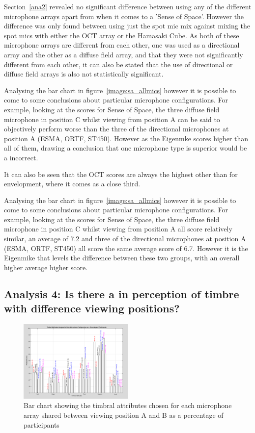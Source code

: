 		Section~\ref{ana2} revealed no significant difference between using any of the different microphone arrays apart from when it comes to a 'Sense of Space'. However the difference was only found between using just the spot mic mix against mixing the spot mics with either the OCT array or the Hamasaki Cube. As both of these microphone arrays are different from each other, one was used as a directional array and the other as a diffuse field array, and that they were not significantly different from each other, it can also be stated that the use of directional or diffuse field arrays is also not statistically significant.


		Analysing the bar chart in figure~\ref{image:sa_allmics} however it is possible to come to some conclusions about particular microphone configurations. For example, looking at the scores for Sense of Space, the three diffuse field microphone in position C whilst viewing from position A can be said to objectively perform worse than the three of the directional microphones at position A (ESMA, ORTF, ST450). However as the Eigenmke scores higher than all of them, drawing a conclusion that one microphone type is superior would be a incorrect.

		It can also be seen that the OCT scores are always the highest other than for envelopment, where it comes as a close third.

		Analysing the bar chart in figure~\ref{image:sa_allmics} however it is possible to come to some conclusions about particular microphone configurations. For example, looking at the scores for Sense of Space, the three diffuse field microphone in position C whilst viewing from position A all score relatively similar, an average of 7.2 and three of the directional microphones at position A (ESMA, ORTF, ST450) all score the same average score of 6.7. However it is the Eigenmike that levels the difference between these two groups, with an overall higher average higher score. 




	\subsection{Analysis 4: Is there a in perception of timbre with difference viewing positions?}

		
		\begin{figure}
			\includegraphics[width=0.5\textwidth]{images/plots/bar_sharedMics.PNG}
			\caption{Bar chart showing the timbral attributes chosen for each microphone array shared between viewing position A and B as a percentage of participants}
			\label{image:ta_sharedmics} 
		\end{figure}		


